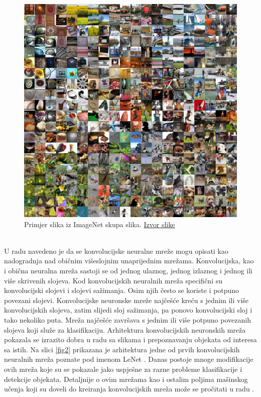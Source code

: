 \documentclass[conference]{IEEEtran}
\begin{document}
\begin{figure}[htbp]
\centerline{\includegraphics[width=\columnwidth]{fig1.jpg}}
\caption{Primjer slika iz ImageNet skupa slika. \href{https://cs.stanford.edu/people/karpathy/cnnembed/}{Izvor slike}}
\label{fig1}
\end{figure}
\\

U radu \cite{b4} navedeno je da se konvolucijske neuralne mreže mogu opisati kao nadogradnja nad običnim višeslojnim unaprijednim mrežama. Konvolucijska, kao i obična neuralna mreža sastoji se od jednog ulaznog, jednog izlaznog i jednog ili više skrivenih slojeva. Kod konvolucijskih neuralnih mreža specifični su konvolucijski slojevi i slojevi sažimanja.
Osim njih često se koriste i potpuno povezani slojevi. Konvolucijske neuronske mreže najčešće kreću s jednim ili više konvolucijskih slojeva, zatim slijedi sloj sažimanja, pa ponovo konvolucijski sloj i tako nekoliko puta. Mreža najčešće završava s jednim ili više potpuno povezanih slojeva koji služe za klasifikaciju. Arhitektura konvolucijskih neuronskih mreža pokazala se izrazito dobra u radu sa slikama i prepoznavanju objekata od interesa sa istih. Na slici \ref{fig2} prikazana je arhitektura jedne od prvih konvolucijskih neuralnih mreža poznate pod imenom LeNet \cite{b5}. Danas postoje mnoge modifikacije ovih mreža koje su se pokazale jako uspješne za razne probleme klasifikacije i detekcije objekata. Detaljnije o ovim mrežama kao i ostalim poljima mašinskog učenja koji su doveli do kreiranja konvolucijskih mreža može se pročitati u radu \cite{b6}. 
\end{document}
